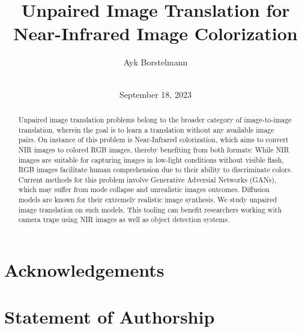 \documentclass[ba,logo]{ivs-thesis}
\title{Unpaired Image Translation for Near-Infrared Image Colorization}
\author{Ayk Borstelmann\\\birthinfo{March 28, 2002 in Aschaffenburg}\\\matricnumber{3441004}}
\date{September 18, 2023}
\begin{document}
\frontmatter

\maketitle

\cleardoublepage
\begin{abstract}
	Unpaired image translation problems belong to the broader category of image-to-image translation, 
	wherein the goal is to learn a translation without any available image pairs. 
	On instance of this problem is Near-Infrared colorization, which aims to convert NIR images to colored RGB images,
	thereby benefiting from both formats:
	While NIR images are suitable for capturing images in low-light conditions without visible flash, 
	RGB images facilitate human comprehension due to their ability to discriminate colors. 
	Current methods for this problem involve Generative Adversial Networks (GANs), 
	which may suffer from mode collapse and unrealistic images outcomes. 
	Diffusion models are known for their extremely realistic image synthesis. 
	We study unpaired image translation on such models. 
	This tooling can benefit researchers working with camera traps using NIR images as well as object detection systems.
\end{abstract}

\chapter*{Acknowledgements}

\cleardoublepage
\chapter*{Statement of Authorship}

% 

\cleardoublepage
\tableofcontents


\mainmatter









\begingroup

\backmatter

\printbibliography[heading=bibintoc]

\listoffigures

\listoftables

\endgroup

\appendix
\end{document}

